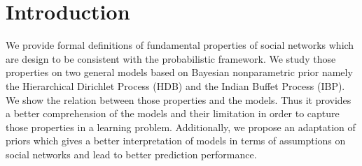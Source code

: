 \section{Introduction}

We provide formal definitions of fundamental properties of social networks which are design to be consistent with the probabilistic framework. We study those properties on two general models based on Bayesian nonparametric prior namely the Hierarchical Dirichlet Process (HDB) and the Indian Buffet Process (IBP). We show the relation between those properties and the models. Thus it provides a better comprehension of the models and their limitation in order to capture those properties in a learning problem. Additionally, we propose an adaptation of priors which gives a better interpretation of models in terms of assumptions on social networks and lead to better prediction performance.

